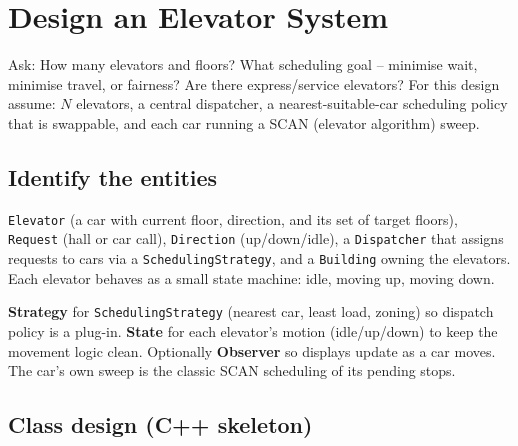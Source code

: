 \section{Design an Elevator System}
\label{sec:case-elevator}


\begin{patternbox}
Ask: How many elevators and floors? What scheduling goal -- minimise wait,
minimise travel, or fairness? Are there express/service elevators? For
this design assume: $N$ elevators, a central dispatcher, a
nearest-suitable-car scheduling policy that is swappable, and each car
running a SCAN (elevator algorithm) sweep.
\end{patternbox}

\subsection*{Identify the entities}

\texttt{Elevator} (a car with current floor, direction, and its set of
target floors), \texttt{Request} (hall or car call), \texttt{Direction}
(up/down/idle), a \texttt{Dispatcher} that assigns requests to cars via a
\texttt{SchedulingStrategy}, and a \texttt{Building} owning the elevators.
Each elevator behaves as a small state machine: idle, moving up, moving
down.

\begin{ideabox}
\textbf{Strategy} for \texttt{SchedulingStrategy} (nearest car, least
load, zoning) so dispatch policy is a plug-in. \textbf{State} for each
elevator's motion (idle/up/down) to keep the movement logic clean.
Optionally \textbf{Observer} so displays update as a car moves. The car's
own sweep is the classic SCAN scheduling of its pending stops.
\end{ideabox}

\subsection*{Class design (C++ skeleton)}

